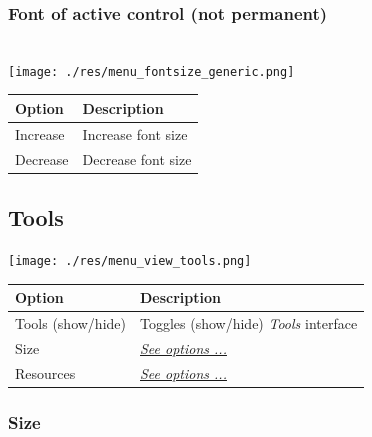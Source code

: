 \hypertarget{menu_r_rterm_fontsize}{}
\subsubsection{Font of active control (not permanent)}\\

\texttt{[image: ./res/menu\_fontsize\_generic.png]}\\

\begin{scriptsize}
  \begin{tabularx}{\textwidth}{>{\hsize=0.3\hsize}X>{\hsize=0.7\hsize}X}\\
    \hline
    \textbf{Option} & \textbf{Description} \\
    \hline
    Increase & Increase font size \\
    Decrease & Decrease font size \\
    \hline
  \end{tabularx}
\end{scriptsize}


\hypertarget{menu_view_tools}{}
\subsection{Tools}

\texttt{[image: ./res/menu\_view\_tools.png]}\\

\begin{scriptsize}
  \begin{tabularx}{\textwidth}{>{\hsize=0.3\hsize}X>{\hsize=0.7\hsize}X}\\
    \hline
    \textbf{Option} & \textbf{Description} \\
    \hline
    Tools (show/hide) & Toggles (show/hide) \textit{Tools} interface \\
    Size & \textit{\href{\#menu\_view\_tools\_size}{See options ...}} \\
    Resources & \textit{\href{\#menu\_view\_tools\_resources}{See options ...}} \\
    \hline
  \end{tabularx}
\end{scriptsize}


\hypertarget{menu_view_tools_size}{}
\subsubsection{Size}\\

